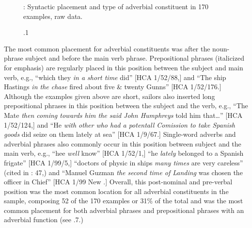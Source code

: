   
\begin{figure}  
 

 

\caption{\label{tab:key:7}.1}: Syntactic placement and type of adverbial constituent in 170 examples, raw data.
\end{figure}


The most common placement for adverbial constituents was after the noun-phrase subject and before the main verb phrase. Prepositional phrases (italicized for emphasis) are regularly placed in this position between the subject and main verb, e.g., “which they \textit{in a short time} did” [HCA 1/52/88,] and “The ship Hastings \textit{in the chase} fired about five \& twenty Gunns” [HCA 1/52/176.] Although the examples given above are short, sailors also inserted long prepositional phrases in this position between the subject and the verb, e.g., “The Mate \textit{then coming towards him the said John Humphreys} told him that…” [HCA 1/52/124,] and “He \textit{with other who had a potentall Comission to take Spanish goods} did seize on them lately at sea” [HCA 1/9/67.] Single-word adverbs and adverbial phrases also commonly occur in this position between subject and the main verb, e.g., “hee \textit{well} know” [HCA 1/52/1,] “he \textit{lately} belonged to a Spanish frigate” [HCA 1/99/5,] “doctors of physic in ships \textit{many times} are very careless” (cited in \citealt{Brown2011}: 47,) and “Manuel Guzman \textit{the second time of Landing} was chosen the officer in Chief” [HCA 1/99 New \citealt{Providence1722}.] Overall, this post-nominal and pre-verbal position was the most common location for all adverbial constituents in the sample, composing 52 of the 170 examples or 31\% of the total and was the most common placement for both adverbial phrases and prepositional phrases with an adverbial function (see .7.) 

